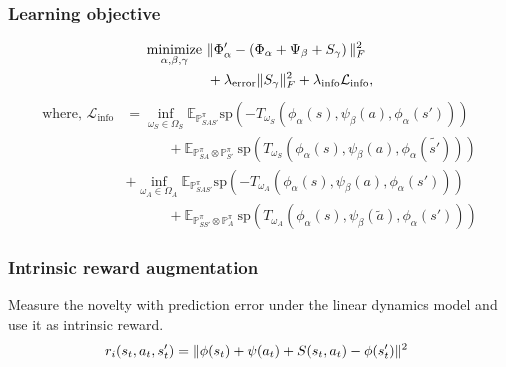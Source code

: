 \documentclass[10pt,mathserif]{beamer}
\begin{document}
\begin{frame}
\frametitle{Learning objective}

\begin{align} 
\operatorname*{minimize}_{\alpha, \beta, \gamma} ~ &\|\Phi'_\alpha - \left( \Phi_\alpha + \Psi_\beta  + S_\gamma \right)\|_F^2 \nonumber\\
&+ \lambda_{\text{error}} \| S_\gamma \|_F^2
+ \lambda_\text{info} \mathcal{L}_\text{info}, \nonumber
\end{align}
\begin{align}
\text{where, }\mathcal{L}_\text{info} &= \inf_{\omega_S \in \Omega_S} \mathbb{E}_{\mathbb{P}_{SAS'}^\pi} \text{sp} \left(-T_{\omega_S}(\phi_\alpha(s), \psi_\beta(a), \phi_\alpha(s'))\right) \nonumber \\
&\qquad \quad + \mathbb{E}_{\mathbb{P}_{SA}^\pi \otimes \mathbb{P}_{S'}^\pi} ~\text{sp} \left(T_{\omega_S}(\phi_\alpha(s), \psi_\beta(a), \phi_\alpha(\tilde{s'}))\right) \nonumber \\
&+ \inf_{\omega_A \in \Omega_A} \mathbb{E}_{\mathbb{P}_{SAS'}^\pi} \text{sp} \left(-T_{\omega_A}(\phi_\alpha(s), \psi_\beta(a), \phi_\alpha(s'))\right) \nonumber \\
&\qquad \quad + \mathbb{E}_{\mathbb{P}_{SS'}^\pi \otimes \mathbb{P}_{A}^\pi} ~\text{sp} \left(T_{\omega_A}(\phi_\alpha(s), \psi_\beta(\tilde{a}), \phi_\alpha(s'))\right) \nonumber
\end{align}


\end{frame}

\begin{frame}
\frametitle{Intrinsic reward augmentation}
Measure the novelty with prediction error under the linear dynamics model and use it as intrinsic reward.
\begin{align}
\hspace{-0.5em}  r_i(s_t, a_t, s_t') = \|\phi(s_t) + \psi(a_t) + S(s_t, a_t) - \phi(s_t')\|^2 \nonumber
\end{align}
\end{frame}

\end{document}
